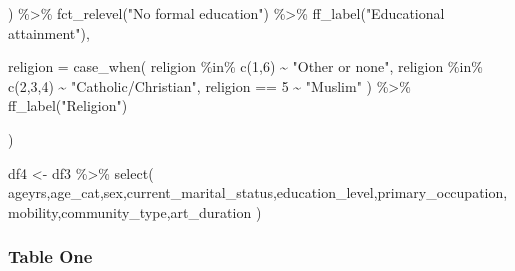 \documentclass[
  letterpaper,
  DIV=11,
  numbers=noendperiod]{scrartcl}
\newenvironment{Shaded}{\begin{snugshade}}{\end{snugshade}}
\newcommand{\AttributeTok}[1]{\textcolor[rgb]{0.40,0.45,0.13}{#1}}
\newcommand{\DecValTok}[1]{\textcolor[rgb]{0.68,0.00,0.00}{#1}}
\newcommand{\FunctionTok}[1]{\textcolor[rgb]{0.28,0.35,0.67}{#1}}
\newcommand{\NormalTok}[1]{\textcolor[rgb]{0.00,0.23,0.31}{#1}}
\newcommand{\OtherTok}[1]{\textcolor[rgb]{0.00,0.23,0.31}{#1}}
\newcommand{\SpecialCharTok}[1]{\textcolor[rgb]{0.37,0.37,0.37}{#1}}
\newcommand{\StringTok}[1]{\textcolor[rgb]{0.13,0.47,0.30}{#1}}
\begin{document}
\begin{Shaded}
\begin{Highlighting}[]
\NormalTok{          ) }\SpecialCharTok{\%\textgreater{}\%} 
           \FunctionTok{fct\_relevel}\NormalTok{(}\StringTok{"No formal education"}\NormalTok{) }\SpecialCharTok{\%\textgreater{}\%} 
           \FunctionTok{ff\_label}\NormalTok{(}\StringTok{"Educational attainment"}\NormalTok{),}
         
         \AttributeTok{religion =} \FunctionTok{case\_when}\NormalTok{(}
\NormalTok{           religion }\SpecialCharTok{\%in\%} \FunctionTok{c}\NormalTok{(}\DecValTok{1}\NormalTok{,}\DecValTok{6}\NormalTok{) }\SpecialCharTok{\textasciitilde{}} \StringTok{"Other or none"}\NormalTok{,}
\NormalTok{           religion }\SpecialCharTok{\%in\%} \FunctionTok{c}\NormalTok{(}\DecValTok{2}\NormalTok{,}\DecValTok{3}\NormalTok{,}\DecValTok{4}\NormalTok{) }\SpecialCharTok{\textasciitilde{}} \StringTok{"Catholic/Christian"}\NormalTok{,}
\NormalTok{           religion }\SpecialCharTok{==} \DecValTok{5} \SpecialCharTok{\textasciitilde{}} \StringTok{"Muslim"}
\NormalTok{         ) }\SpecialCharTok{\%\textgreater{}\%} 
           \FunctionTok{ff\_label}\NormalTok{(}\StringTok{"Religion"}\NormalTok{)}
                                    
         
\NormalTok{  )}
\end{Highlighting}
\end{Shaded}

\begin{Shaded}
\begin{Highlighting}[]
\NormalTok{df4 }\OtherTok{\textless{}{-}}\NormalTok{ df3 }\SpecialCharTok{\%\textgreater{}\%} 
  \FunctionTok{select}\NormalTok{(}
\NormalTok{    ageyrs,age\_cat,sex,current\_marital\_status,education\_level,primary\_occupation,}
\NormalTok{    mobility,community\_type,art\_duration}
\NormalTok{  )}
\end{Highlighting}
\end{Shaded}

\subsubsection{\texorpdfstring{\textbf{Table
One}}{Table One}}\label{table-one}
\end{document}
